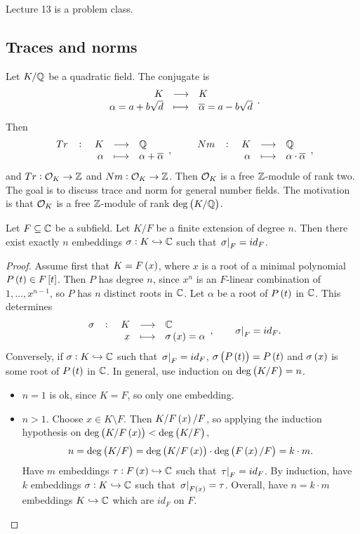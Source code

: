 
Lecture 13 is a problem class.

\pagebreak

\subsection{Traces and norms}


Let $ K / \mathbb{Q} $ be a quadratic field. The conjugate is
$$ \function{K}{K}{\alpha = a + b\sqrt{d}}{\overline{\alpha} = a - b\sqrt{d}}. $$
Then
$$ \function[Tr]{K}{\Q}{\alpha}{\alpha + \overline{\alpha}}, \qquad \function[Nm]{K}{\Q}{\alpha}{\alpha \cdot \overline{\alpha}}, $$
and $ Tr : \mathcal{O}_K \to \mathbb{Z} $ and $ Nm : \mathcal{O}_K \to \mathbb{Z} $. Then $ \mathcal{O}_K $ is a free $ \mathbb{Z} $-module of rank two. The goal is to discuss trace and norm for general number fields. The motivation is that $ \mathcal{O}_K $ is a free $ \mathbb{Z} $-module of rank $ \deg\br{K / \Q} $.

\begin{proposition}
\label{prop:embeddings}
Let $ F \subseteq \mathbb{C} $ be a subfield. Let $ K / F $ be a finite extension of degree $ n $. Then there exist exactly $ n $ embeddings $ \sigma : K \hookrightarrow \mathbb{C} $ such that $ \left. \sigma \right|_F = id_F $.
\end{proposition}

\begin{proof}
Assume first that $ K = F\br{x} $, where $ x $ is a root of a minimal polynomial $ P\br{t} \in F\sbr{t} $. Then $ P $ has degree $ n $, since $ x^n $ is an $ F $-linear combination of $ 1, \dots, x^{n - 1} $, so $ P $ has $ n $ distinct roots in $ \mathbb{C} $. Let $ \alpha $ be a root of $ P\br{t} $ in $ \mathbb{C} $. This determines
$$ \function[\sigma]{K}{\C}{x}{\sigma\br{x} = \alpha}, \qquad \eval{\sigma}_F = id_F. $$
Conversely, if $ \sigma : K \hookrightarrow \mathbb{C} $ such that $ \left. \sigma \right|_F = id_F $, $ \sigma\br{P\br{t}} = P\br{t} $ and $ \sigma\br{x} $ is some root of $ P\br{t} $ in $ \mathbb{C} $. In general, use induction on $ \deg\br{K / F} = n $.
\begin{itemize}
\item $ n = 1 $ is ok, since $ K = F $, so only one embedding.
\item $ n > 1 $. Choose $ x \in K \setminus F $. Then $ K / F\br{x} / F $, so applying the induction hypothesis on $ \deg\br{K / F\br{x}} < \deg\br{K / F} $,
$$ n = \deg\br{K / F} = \deg\br{K / F\br{x}} \cdot \deg\br{F\br{x} / F} = k \cdot m. $$
Have $ m $ embeddings $ \tau : F\br{x} \hookrightarrow \C $ such that $ \left. \tau \right|_F = id_F $. By induction, have $ k $ embeddings $ \sigma : K \hookrightarrow \mathbb{C} $ such that $ \eval{\sigma}_{F\br{x}} = \tau $. Overall, have $ n = k \cdot m $ embeddings $ K \hookrightarrow \mathbb{C} $ which are $ id_F $ on $ F $.
\end{itemize}
\end{proof}

